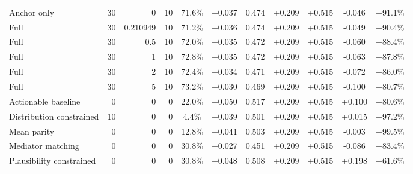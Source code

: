 \begin{table}[htbp]
\begin{tabular}{lrrrccccccc}
Anchor only & 30 & 0 & 10 & 71.6\% & +0.037 & 0.474 & +0.209 & +0.515 & -0.046 & +91.1\% \\
Full & 30 & 0.210949 & 10 & 71.2\% & +0.036 & 0.474 & +0.209 & +0.515 & -0.049 & +90.4\% \\
Full & 30 & 0.5 & 10 & 72.0\% & +0.035 & 0.472 & +0.209 & +0.515 & -0.060 & +88.4\% \\
Full & 30 & 1 & 10 & 72.8\% & +0.035 & 0.472 & +0.209 & +0.515 & -0.063 & +87.8\% \\
Full & 30 & 2 & 10 & 72.4\% & +0.034 & 0.471 & +0.209 & +0.515 & -0.072 & +86.0\% \\
Full & 30 & 5 & 10 & 73.2\% & +0.030 & 0.469 & +0.209 & +0.515 & -0.100 & +80.7\% \\
Actionable baseline & 0 & 0 & 0 & 22.0\% & +0.050 & 0.517 & +0.209 & +0.515 & +0.100 & +80.6\% \\
Distribution constrained & 10 & 0 & 0 & 4.4\% & +0.039 & 0.501 & +0.209 & +0.515 & +0.015 & +97.2\% \\
Mean parity & 0 & 0 & 0 & 12.8\% & +0.041 & 0.503 & +0.209 & +0.515 & -0.003 & +99.5\% \\
Mediator matching & 0 & 0 & 0 & 30.8\% & +0.027 & 0.451 & +0.209 & +0.515 & -0.086 & +83.4\% \\
Plausibility constrained & 0 & 0 & 0 & 30.8\% & +0.048 & 0.508 & +0.209 & +0.515 & +0.198 & +61.6\% \\
\bottomrule
\end{tabular}
\end{table}